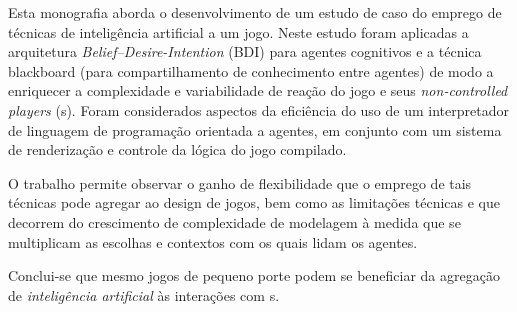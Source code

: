 Esta monografia aborda o desenvolvimento de um estudo de caso do emprego de técnicas de inteligência artificial a um jogo. Neste estudo foram aplicadas a arquitetura \emph{Belief--Desire-Intention} (BDI) para agentes cognitivos e a técnica blackboard (para compartilhamento de conhecimento entre agentes) de modo a enriquecer a complexidade e variabilidade de reação do jogo e seus \emph{non-controlled players} (\npc{}s). Foram considerados aspectos da eficiência do uso de um interpretador de linguagem de programação orientada a agentes, em conjunto com um sistema de renderização e controle da lógica do jogo compilado.

O trabalho permite observar o ganho de flexibilidade que o emprego de tais técnicas pode agregar ao design de jogos, bem como as limitações técnicas e que decorrem do crescimento de complexidade de modelagem à medida que se multiplicam as escolhas e contextos com os quais lidam os agentes.

Conclui-se que mesmo jogos de pequeno porte podem se beneficiar da agregação de \emph{inteligência artificial} às interações com \npc{}s.


